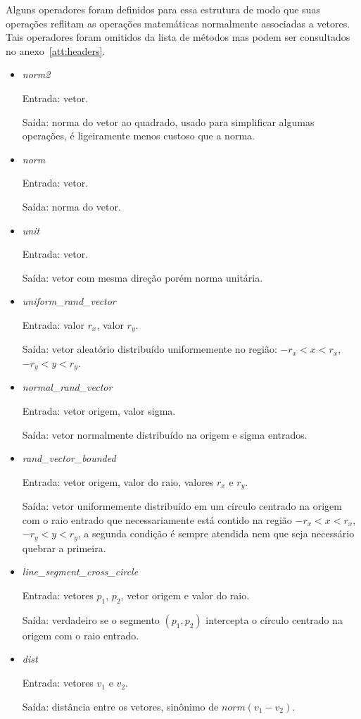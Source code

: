 Alguns operadores foram definidos para essa estrutura de modo que suas operações
reflitam as operações matemáticas normalmente associadas a vetores.  Tais
operadores foram omitidos da lista de métodos mas podem ser consultados no
anexo~\ref{att:headers}.

\begin{itemize}
  \item \textit{norm2}
    \par Entrada: vetor.
    \par Saída: norma do vetor ao quadrado, usado para simplificar algumas
    operações, é ligeiramente menos custoso que a norma.
  \item \textit{norm}
    \par Entrada: vetor.
    \par Saída: norma do vetor.
  \item \textit{unit}
    \par Entrada: vetor.
    \par Saída: vetor com mesma direção porém norma unitária.
  \item \textit{uniform_rand_vector}
    \par Entrada: valor $r_x$, valor $r_y$.
    \par Saída: vetor aleatório distribuído uniformemente no região:
    $-r_x < x < r_x$, $-r_y < y < r_y$.
  \item \textit{normal_rand_vector}
    \par Entrada: vetor origem, valor sigma.
    \par Saída: vetor normalmente distribuído na origem e sigma entrados.
  \item \textit{rand_vector_bounded}
    \par Entrada: vetor origem, valor do raio, valores $r_x$ e $r_y$.
    \par Saída: vetor uniformemente distribuído em um círculo centrado na origem
    com o raio entrado que necessariamente está contido na região
    $-r_x < x < r_x$, $-r_y < y < r_y$, a segunda condição é sempre atendida nem
    que seja necessário quebrar a primeira.
  \item \textit{line_segment_cross_circle}
    \par Entrada: vetores $p_1$, $p_2$, vetor origem e valor do raio.
    \par Saída: verdadeiro se o segmento $(p_1, p_2)$ intercepta o círculo
    centrado na origem com o raio entrado.
  \item \textit{dist}
    \par Entrada: vetores $v_1$ e $v_2$.
    \par Saída: distância entre os vetores, sinônimo de $norm(v_1 - v_2)$.
\end{itemize}


